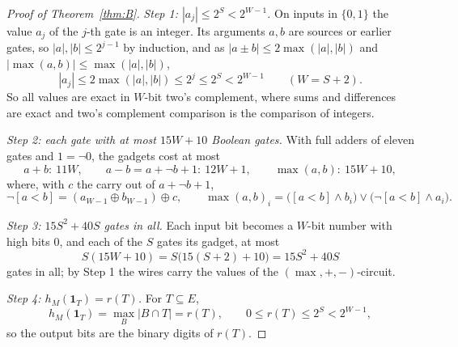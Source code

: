 \begin{proof}[Proof of Theorem~\ref{thm:B}]
\emph{Step 1: $|a_j|\le2^{S}<2^{W-1}$.}  On inputs in $\{0,1\}$ the value $a_j$ of the $j$-th gate
is an integer.  Its arguments $a,b$ are sources or earlier gates, so
$|a|,|b|\le2^{j-1}$ by induction, and as $|a\pm b|\le2\max(|a|,|b|)$ and
$|\max(a,b)|\le\max(|a|,|b|)$,
\[
  |a_j|\le2\max(|a|,|b|)\le2^{j}\le2^{S}<2^{W-1}\qquad(W=S+2).
\]
So all values are exact in $W$-bit two's complement, where sums and differences
are exact and two's complement comparison is the comparison of integers.

\emph{Step 2: each gate with at most $15W+10$ Boolean gates.}  With full adders of eleven gates and $1=\neg0$, the
gadgets cost at most
\[
  a+b:\ 11W,\qquad a-b=a+\neg b+1:\ 12W+1,\qquad \max(a,b):\ 15W+10,
\]
where, with $c$ the carry out of $a+\neg b+1$,
\[
  \neg[a<b]=(a_{W-1}\oplus b_{W-1})\oplus c,\qquad
  \max(a,b)_i=\bigl([a<b]\wedge b_i\bigr)\vee\bigl(\neg[a<b]\wedge a_i\bigr).
\]

\emph{Step 3: $15S^{2}+40S$ gates in all.}  Each input bit becomes a $W$-bit number with high bits
$0$, and each of the $S$ gates its gadget, at most
\[
  S(15W+10)=S\bigl(15(S+2)+10\bigr)=15S^{2}+40S
\]
gates in all; by Step 1 the wires carry the values of the $(\max,+,-)$-circuit.

\emph{Step 4: $h_M(\mathbf 1_T)=r(T)$.}  For $T\subseteq E$,
\[
  h_M(\mathbf 1_T)=\max_{B}|B\cap T|=r(T),\qquad0\le r(T)\le2^{S}<2^{W-1},
\]
so the output bits are the binary digits of $r(T)$.
\end{proof}

